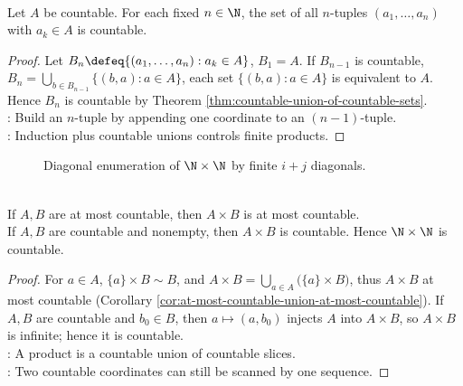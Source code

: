 \begin{theorem} \label{thm:finite-tuples-over-countable-set-countable} \\
Let $A$ be countable. For each fixed $n\in\N$, the set of all $n$-tuples $(a_1,\ldots,a_n)$ with $a_k\in A$ is countable.
\begin{proof} Let $B_n\defeq \{(a_1,\ldots,a_n): a_k\in A\}$, $B_1=A$. If $B_{n-1}$ is countable, $B_n=\bigcup\limits_{b\in B_{n-1}}\{(b,a):a\in A\}$, each set $\{(b,a):a\in A\}$ is equivalent to $A$. Hence $B_n$ is countable by Theorem \ref{thm:countable-union-of-countable-sets}.\\
: Build an $n$-tuple by appending one coordinate to an $(n-1)$-tuple.\\
: Induction plus countable unions controls finite products.
\end{proof}
\end{theorem}

\begin{figure}[H]
  \centering
  
  \caption{Diagonal enumeration of $\N\times\N$ by finite $i+j$ diagonals.}
  \label{fig:countable-diagonal-enumeration}
\end{figure}

\begin{corollary} \label{cor:countable-cartesian-products} \\
If $A,B$ are at most countable, then $A\times B$ is at most countable.\\
If $A,B$ are countable and nonempty, then $A\times B$ is countable. Hence $\N\times\N$ is countable.
\begin{proof}
For $a\in A$, $\{a\}\times B\sim B$, and $A\times B=\bigcup\limits_{a\in A}\bigl(\{a\}\times B\bigr)$, thus $A\times B$ at most countable (Corollary \ref{cor:at-most-countable-union-at-most-countable}). If $A,B$ are countable and $b_0\in B$, then $a\mapsto(a,b_0)$ injects $A$ into $A\times B$, so $A\times B$ is infinite; hence it is countable.\\
: A product is a countable union of countable slices.\\
: Two countable coordinates can still be scanned by one sequence.
\end{proof}
\end{corollary}

